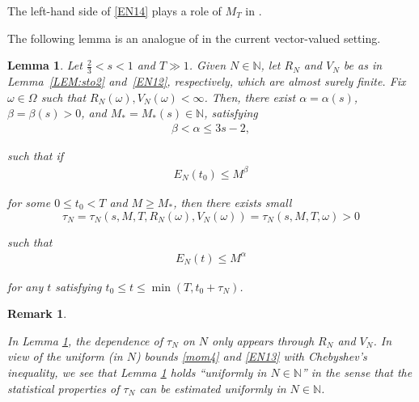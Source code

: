 \documentclass[letterpaper, 11pt,  reqno]{amsart}
\newtheorem{lemma}[theorem]{Lemma}
\newtheorem{remark}[theorem]{Remark}
\newcommand{\1}{\hspace{0.5mm}\text{I}\hspace{0.2mm}}
\newcommand{\noi}{\noindent}
\newcommand{\N}{\mathbb{N}}
\newcommand{\al}{\alpha}
\newcommand{\be}{\beta}
\newcommand{\EN}{E_N}
\renewcommand{\O}{\Omega}
\renewcommand{\o}{\omega}
\numberwithin{equation}{section}
\numberwithin{theorem}{section}
\begin{document}
\noi
The left-hand side of \eqref{EN14}
plays a role of $M_T$ 
in \cite[(3.24)]{GKOT}.






The following lemma
is an analogue of
\cite[Proposition 3.5]{GKOT}
in the current vector-valued setting.




\begin{lemma}
\label{LEM:GWP1a}
Let $\frac 23 < s < 1$
and $T \gg 1$.
Given $N \in \N$, 
 let $R_N$ and $V_N$ be as in Lemma~\ref{LEM:sto2}
 and~\eqref{EN12}, respectively, 
 which are almost surely finite.
Fix $\o \in \O$
such that $R_N(\o), V_N(\o) < \infty$.
Then, there exist $\al = \al(s) $,  $\be = \be(s)> 0$, 
and  $M_* = M_*(s) \in \N$, 
satisfying
\begin{align}
\be < \al \le 3s - 2, 
\label{EN15a}
\end{align}

\noi
 such that 
if \begin{align}
\EN(t_0) \le M^\beta
\label{EN15}
\end{align}


\noi
for some $0 \le t_0 < T$
and   $M \ge M_*$,
 then
there exists
small 
\[\tau_N = \tau_N (s, M, T, R_N(\o), V_N(\o)) = \tau_N (s, M, T, \o) >0 \] 

\noi
such that 
\begin{align*}
\EN(t) \le M^\alpha
\end{align*} 

\noi
for any $t $
satisfying
$t_0 \le t \le \min(T, t_0 + \tau_N)$. 

\end{lemma}



\begin{remark}\label{REM:unif1}\rm

In Lemma \ref{LEM:GWP1a}, 
the dependence of $\tau_N$ on $N$ 
only appears through
$R_N$ and $V_N$.
In view of 
the uniform (in $N$) bounds
\eqref{mom4}
and
\eqref{EN13}
with Chebyshev's inequality, 
we see that 
Lemma \ref{LEM:GWP1a}
holds ``uniformly in $N \in \N$''
in the sense that the statistical properties
of $\tau_N$ can be 
estimated 
uniformly in $N \in \N$.

\end{remark}
\end{document}
